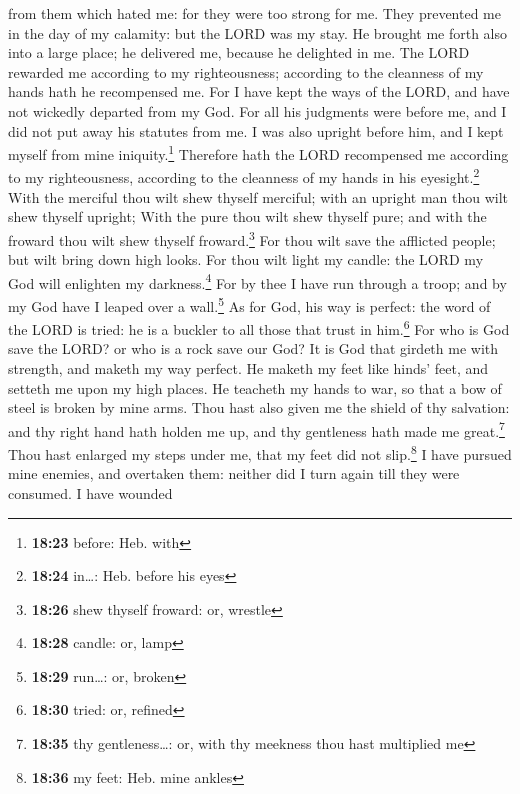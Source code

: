from them which hated me: for they were too strong for me.
 They prevented me in the day of my calamity: but the
LORD was my stay.  He brought me forth also into a large
place; he delivered me, because he delighted in me.  The
LORD rewarded me according to my righteousness; according to the
cleanness of my hands hath he recompensed me.  For I have
kept the ways of the LORD, and have not wickedly departed from my God.
 For all his judgments were before me, and I did not put
away his statutes from me.  I was also upright before
him, and I kept myself from mine iniquity.\footnote{\textbf{18:23}
  before: Heb. with}  Therefore hath the LORD recompensed
me according to my righteousness, according to the cleanness of my hands
in his eyesight.\footnote{\textbf{18:24} in\ldots: Heb. before his eyes}
 With the merciful thou wilt shew thyself merciful; with
an upright man thou wilt shew thyself upright;  With the
pure thou wilt shew thyself pure; and with the froward thou wilt shew
thyself froward.\footnote{\textbf{18:26} shew thyself froward: or,
  wrestle}  For thou wilt save the afflicted people; but
wilt bring down high looks.  For thou wilt light my
candle: the LORD my God will enlighten my darkness.\footnote{\textbf{18:28}
  candle: or, lamp}  For by thee I have run through a
troop; and by my God have I leaped over a wall.\footnote{\textbf{18:29}
  run\ldots: or, broken}  As for God, his way is perfect:
the word of the LORD is tried: he is a buckler to all those that trust
in him.\footnote{\textbf{18:30} tried: or, refined}  For
who is God save the LORD? or who is a rock save our God? 
It is God that girdeth me with strength, and maketh my way perfect.
 He maketh my feet like hinds' feet, and setteth me upon
my high places.  He teacheth my hands to war, so that a
bow of steel is broken by mine arms.  Thou hast also
given me the shield of thy salvation: and thy right hand hath holden me
up, and thy gentleness hath made me great.\footnote{\textbf{18:35} thy
  gentleness\ldots: or, with thy meekness thou hast multiplied me}
 Thou hast enlarged my steps under me, that my feet did
not slip.\footnote{\textbf{18:36} my feet: Heb. mine ankles}
 I have pursued mine enemies, and overtaken them: neither
did I turn again till they were consumed.  I have wounded
